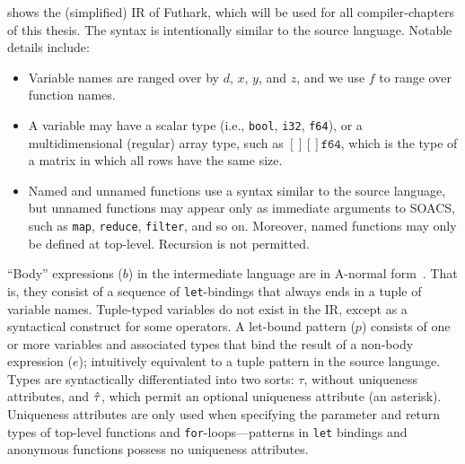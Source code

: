  shows the (simplified) IR of Futhark,
which will be used for all compiler-chapters of this thesis.  The
syntax is intentionally similar to the source language.  Notable
details include:
\begin{itemize}
\item Variable names are ranged over by $d$, $x$, $y$, and $z$, and we use
  $f$ to range over function names.
\item A variable may have a scalar type (i.e., \texttt{bool},
  \texttt{i32}, \texttt{f64}), or a multidimensional (regular) array
  type, such as $[][]\texttt{f64}$, which is the type of a matrix in
  which all rows have the same size.
\item Named and unnamed functions use a syntax similar to the source
  language, but unnamed functions may appear only as immediate
  arguments to SOACS, such as \lstinline{map}, \lstinline{reduce},
  \lstinline{filter}, and so on. Moreover, named functions may only be
  defined at top-level.  Recursion is not permitted.
\end{itemize}
``Body'' expressions ($b$) in the intermediate language are in
A-normal form~\cite{Sabry:1992:RPC:141478.141563}.  That is, they
consist of a sequence of \lstinline{let}-bindings that always ends in
a tuple of variable names.  Tuple-typed variables do not exist in the
IR, except as a syntactical construct for some operators.  A let-bound
pattern ($p$) consists of one or more variables and associated types
that bind the result of a non-body expression ($e$); intuitively
equivalent to a tuple pattern in the source language.  Types are
syntactically differentiated into two sorts: $\tau$, without
uniqueness attributes, and $\hat{\tau}$, which permit an optional
uniqueness attribute (an asterisk).  Uniqueness attributes are only
used when specifying the parameter and return types of top-level
functions and \lstinline{for}-loops---patterns in \lstinline{let}
bindings and anonymous functions possess no uniqueness attributes.


